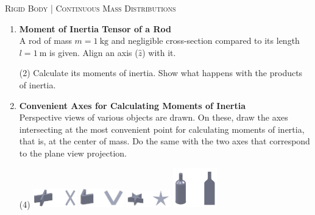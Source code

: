 \documentclass[11pt, a4paper, twoside]{article}
\begin{document}
\begin{center}
  \textsc{\large Rigid Body | Continuous Mass Distributions}
\end{center}


\begin{enumerate}
	\item
	\textbf{Moment of Inertia Tensor of a Rod}\\
	A rod of mass \(m= \SI{1}{\kilo\gram}\)  and negligible cross-section compared to its length \(l= \SI{1}{\metre}\) is given.
	Align an axis (\(\hat{z}\)) with it. 
	\begin{tasks}(2)
		\task Calculate its moments of inertia.
		\task Show what happens with the products of inertia. 
	\end{tasks}


	\item
	\textbf{Convenient Axes for Calculating Moments of Inertia}\\
	Perspective views of various objects are drawn. On these, draw the axes intersecting at the most convenient point for calculating moments of inertia, that is, at the center of mass. Do the same with the two axes that correspond to the plane view projection.
	\vspace{-0.8cm}
	\begin{tasks}(4)
		\task \includegraphics[width=0.15\textwidth]{figures/o-000}
		\task \includegraphics[width=0.15\textwidth]{figures/o-001}
		\task \includegraphics[width=0.15\textwidth]{figures/o-002}
		\task \includegraphics[width=0.15\textwidth]{figures/o-003}
	\end{tasks}



\end{enumerate}
\end{document}
